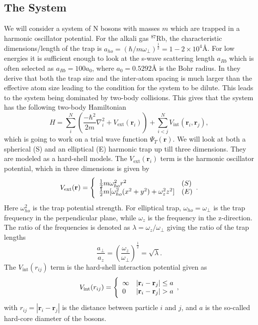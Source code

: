 \documentclass[12pt,a4paper,english]{article}
\begin{document}
\subsection{The System}
\label{subsect:System}
We will consider a system of N bosons with masses $m$ which are trapped in a harmonic oscillator potential. For the alkali gas $^{87}$Rb, the characteristic dimensions/length of the trap is $a_{ho}=(\hbar/m\omega_{\perp})^{\frac{1}{2}}=1-2\times10^4$Å. For low energies it is sufficient enough to look at the s-wave scattering length $a_{Rb}$ which is often selected as $a_{Rb}=100a_0$, where $a_0=0.5292$Å is the Bohr radius. In \citet{dubois2001bose} they derive that both the trap size and the inter-atom spacing is much larger than the effective atom size leading to the condition for the system to be dilute. This leads to the system being dominated by two-body collisions. This gives that the system has the following two-body Hamiltonian
\begin{equation}
\label{eq:sys_Hamiltonian}
H=\sum_i^N\left(\frac{-\hbar^2}{2m}\nabla_i^2+V_{\text{ext}}(\textbf{r}_i)\right)+\sum_{i<j}^{N}V_{\text{int}}(\textbf{r}_i,\textbf{r}_j),
\end{equation}
which is going to work on a trial wave function $\Psi_T(\textbf{r})$. We will look at both a spherical (S) and an elliptical (E) harmonic trap up till three dimensions. They are modeled as a hard-shell models. The $V_{\text{ext}}(\textbf{r}_i)$ term is the harmonic oscillator potential, which in three dimensions is given by
\begin{equation}
\label{eq:V_ext}
V_{\text{ext}}(\textbf{r})= \Bigg\{
\begin{array}{ll}
\frac{1}{2}m\omega_{ho}^2r^2 & (S)\\
\strut
\frac{1}{2}m[\omega_{ho}^2(x^2+y^2) + \omega_z^2z^2] & (E)
\end{array}.
\end{equation}
Here $\omega_{ho}^2$ is the trap potential strength. For elliptical trap, $\omega_{ho}=\omega_{\perp}$ is the trap frequency in the perpendicular plane, while $\omega_z$ is the frequency in the z-direction. The ratio of the frequencies is denoted as $\lambda=\omega_z/\omega_{\perp}$ giving the ratio of the trap lengths 
\begin{equation*}
\frac{a_{\perp}}{a_z}=\left(\frac{\omega_z}{\omega_{\perp}}\right)^{\frac{1}{2}}=\sqrt{\lambda}.
\end{equation*} 
The $V_{\text{int}}(r_{ij})$ term is the hard-shell interaction potential given as
\begin{equation}
\label{eq:V_int}
V_{\text{int}}(r_{ij})= \Bigg\{
\begin{array}{ll}
\infty & |\textbf{r}_i-\textbf{r}_j|\leq a\\
\strut
0 & |\textbf{r}_i-\textbf{r}_j|> a
\end{array},
\end{equation}
with $r_{ij}=|\textbf{r}_i-\textbf{r}_j|$ is the distance between particle $i$ and $j$, and $a$ is the so-called hard-core diameter of the bosons.
\end{document}
